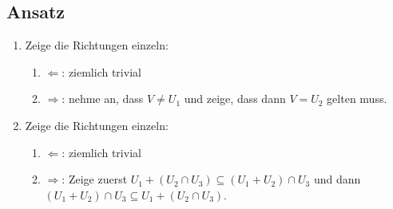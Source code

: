\subsection{Ansatz}
\begin{enumerate}
	\item Zeige die Richtungen einzeln:
	\begin{enumerate}
	 	\item \( \Leftarrow \): ziemlich trivial
	 	\item \( \Rightarrow \): nehme an, dass \( V \neq U_1 \) und zeige, dass dann \( V = U_2 \) gelten muss.
	 \end{enumerate} 

	 \item Zeige die Richtungen einzeln:
	 \begin{enumerate}
	 	\item \( \Leftarrow \): ziemlich trivial
	 	\item \( \Rightarrow \): Zeige zuerst \( U_1 + (U_2 \cap U_3) \subseteq (U_1 + U_2) \cap U_3 \) und dann \( (U_1 + U_2) \cap U_3 \subseteq U_1 + (U_2 \cap U_3) \).
	 \end{enumerate}
\end{enumerate}

